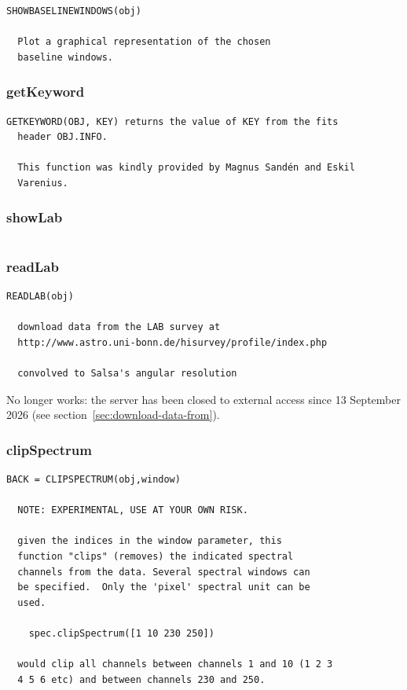\documentclass[11pt,a4paper]{article}
\begin{document}
\begin{lstlisting}[framerule=0pt]
  SHOWBASELINEWINDOWS(obj)
  
  Plot a graphical representation of the chosen
  baseline windows.
\end{lstlisting}


\subsubsection*{getKeyword}
\label{sec:getkeyword}

\begin{lstlisting}[framerule=0pt]
  GETKEYWORD(OBJ, KEY) returns the value of KEY from the fits
  header OBJ.INFO.  
  
  This function was kindly provided by Magnus Sandén and Eskil
  Varenius.
\end{lstlisting}


\subsubsection*{showLab}
\label{sec:showlab}

\begin{lstlisting}[framerule=0pt]

\end{lstlisting}


\subsubsection*{readLab}
\label{sec:readlab}

\begin{lstlisting}[framerule=0pt]
  READLAB(obj)
  
  download data from the LAB survey at
  http://www.astro.uni-bonn.de/hisurvey/profile/index.php
  
  convolved to Salsa's angular resolution
\end{lstlisting}
No longer works: the server has been closed to external access since
13 September 2026 (see section~\ref{sec:download-data-from}).

\subsubsection*{clipSpectrum}
\label{sec:clipspectrum}

\begin{lstlisting}[framerule=0pt]
  BACK = CLIPSPECTRUM(obj,window)
  
  NOTE: EXPERIMENTAL, USE AT YOUR OWN RISK.
  
  given the indices in the window parameter, this
  function "clips" (removes) the indicated spectral
  channels from the data. Several spectral windows can
  be specified.  Only the 'pixel' spectral unit can be
  used. 
  
    spec.clipSpectrum([1 10 230 250])
  
  would clip all channels between channels 1 and 10 (1 2 3
  4 5 6 etc) and between channels 230 and 250.
\end{lstlisting}
\end{document}
